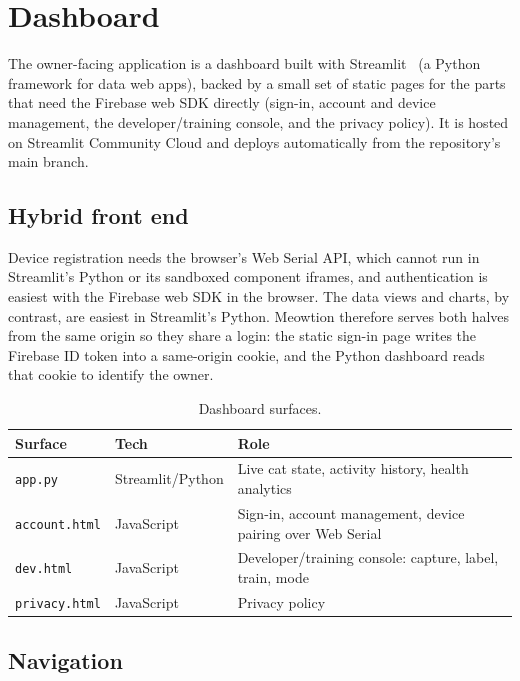 \section{Dashboard}
\label{sec:dashboard}

The owner-facing application is a dashboard built with Streamlit~\cite{streamlit} (a Python framework
for data web apps), backed by a small set of static
pages for the parts that need the Firebase web SDK directly (sign-in, account and device management,
the developer/training console, and the privacy policy). It is hosted on Streamlit Community Cloud and
deploys automatically from the repository's main branch.

\subsection{Hybrid front end}

Device registration needs the browser's Web Serial API, which cannot run in Streamlit's Python or its
sandboxed component iframes, and authentication is easiest with the Firebase web SDK in the browser.
The data views and charts, by contrast, are easiest in Streamlit's Python. Meowtion therefore serves
both halves from the same origin so they share a login: the static sign-in page writes the Firebase ID
token into a same-origin cookie, and the Python dashboard reads that cookie to identify the owner.

\begin{table}[ht]
  \centering
  \caption{Dashboard surfaces.}
  \label{tab:dash}
  \begin{tabularx}{\textwidth}{@{}llX@{}}
    \toprule
    \textbf{Surface} & \textbf{Tech} & \textbf{Role} \\
    \midrule
    \texttt{app.py}       & Streamlit/Python & Live cat state, activity history, health analytics \\
    \texttt{account.html} & JavaScript       & Sign-in, account management, device pairing over Web Serial \\
    \texttt{dev.html}     & JavaScript       & Developer/training console: capture, label, train, mode \\
    \texttt{privacy.html} & JavaScript       & Privacy policy \\
    \bottomrule
  \end{tabularx}
\end{table}

\subsection{Navigation}

